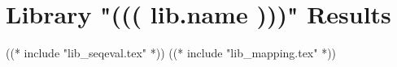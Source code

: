 \section{Library "((( lib.name )))" Results}
\label{lib:(((lib.name)))}

((* include "lib_seqeval.tex" *))
\clearpage
((* include "lib_mapping.tex" *))
